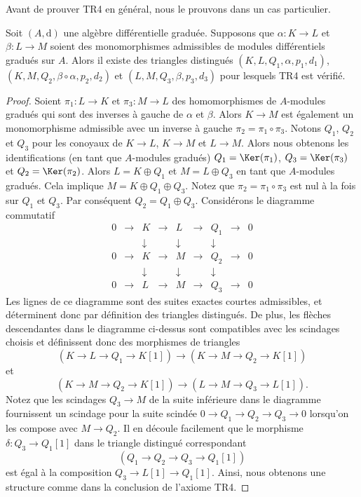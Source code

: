 \noindent
Avant de prouver TR4 en général, nous le prouvons dans un cas particulier.

\begin{lemma}
\label{lemma-two-split-injections}
Soit $(A, \text{d})$ une algèbre différentielle graduée. Supposons que $\alpha : K
\to L$ et $\beta : L \to M$ soient des monomorphismes admissibles de modules
différentiels gradués sur $A$. Alors il existe des triangles distingués $(K, L, Q_1,
\alpha, p_1, d_1)$, $(K, M, Q_2, \beta \circ \alpha, p_2, d_2)$ et $(L, M, Q_3,
\beta, p_3, d_3)$ pour lesquels TR4 est vérifié.
\end{lemma}

\begin{proof}
Soient $\pi_1 : L \to K$ et $\pi_3 : M \to L$ des homomorphismes de
$A$-modules gradués qui sont des inverses à gauche de $\alpha$ et $\beta$. Alors
$K \to M$ est également un monomorphisme admissible avec un inverse à gauche
$\pi_2 = \pi_1 \circ \pi_3$. Notons $Q_1$, $Q_2$ et $Q_3$ pour les
conoyaux de $K \to L$, $K \to M$ et $L \to M$. Alors nous obtenons les
identifications (en tant que $A$-modules gradués) $Q_1 = \Ker(\pi_1)$, $Q_3 =
\Ker(\pi_3)$ et $Q_2 = \Ker(\pi_2)$. Alors $L = K \oplus Q_1$ et $M = L \oplus
Q_3$ en tant que $A$-modules gradués. Cela implique $M = K \oplus Q_1 \oplus Q_3$.
Notez que $\pi_2 = \pi_1 \circ \pi_3$ est nul à la fois sur $Q_1$ et $Q_3$. Par
conséquent $Q_2 = Q_1 \oplus Q_3$. Considérons le diagramme commutatif
$$
\begin{matrix}
0 & \to & K & \to & L & \to & Q_1 & \to & 0 \\
  &     & \downarrow &     & \downarrow &     & \downarrow  & \\
0 & \to & K & \to & M & \to & Q_2 & \to & 0 \\
  &     & \downarrow &     & \downarrow &     & \downarrow  & \\
0 & \to & L & \to & M & \to & Q_3 & \to & 0
\end{matrix}
$$
Les lignes de ce diagramme sont des suites exactes courtes admissibles, et
déterminent donc par définition des triangles distingués. De plus, les flèches
descendantes dans le diagramme ci-dessus sont compatibles avec les scindages
choisis et définissent donc des morphismes de triangles
$$
(K \to L \to Q_1 \to K[1])
\longrightarrow
(K \to M \to Q_2 \to K[1])
$$
et
$$
(K \to M \to Q_2 \to K[1])
\longrightarrow
(L \to M \to Q_3 \to L[1]).
$$
Notez que les scindages $Q_3 \to M$ de la suite inférieure dans le diagramme
fournissent un scindage pour la suite scindée $0 \to Q_1 \to Q_2 \to Q_3 \to 0$
lorsqu’on les compose avec $M \to Q_2$. Il en découle facilement que le morphisme
$\delta : Q_3 \to Q_1[1]$ dans le triangle distingué correspondant
$$
(Q_1 \to Q_2 \to Q_3 \to Q_1[1])
$$
est égal à la composition $Q_3 \to L[1] \to Q_1[1]$. Ainsi, nous obtenons une
structure comme dans la conclusion de l’axiome TR4.
\end{proof}

